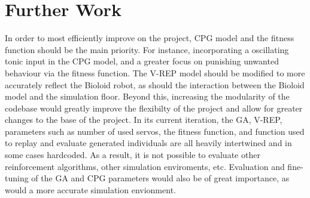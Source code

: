 \section{Further Work}
In order to most efficiently improve on the project, CPG model and the fitness function should be the main priority. For instance, incorporating a oscillating tonic input in the CPG model, and a greater focus on punishing unwanted behaviour via the fitness function. The V-REP model should be modified to more accurately reflect the Bioloid robot, as should the interaction between the Bioloid model and the simulation floor. Beyond this, increasing the modularity of the codebase would greatly improve the flexibilty of the project and allow for greater changes to the base of the project. In its current iteration, the GA, V-REP, parameters such as number of used servos, the fitness function, and function used to replay and evaluate generated individuals are all heavily intertwined and in some cases hardcoded. As a result, it is not possible to evaluate other reinforcement algorithms, other simulation enviroments, etc. Evaluation and fine-tuning of the GA and CPG parameters would also be of great importance, as would a more accurate simulation envionment.